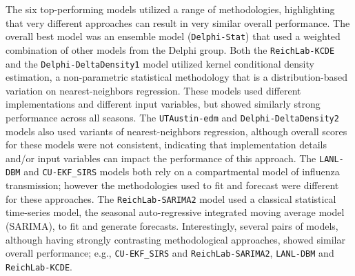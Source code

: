 \documentclass[9pt,twocolumn,twoside]{pnas-new}\usepackage[]{graphicx}\usepackage[]{color}
\begin{document}

The six top-performing models utilized a range of methodologies, highlighting that very different approaches can result in very similar overall performance. 
The overall best model was an ensemble model ({\tt Delphi-Stat}) that used a weighted combination of other models from the Delphi group.
Both the {\tt ReichLab-KCDE} and the {\tt Delphi-DeltaDensity1} model utilized kernel conditional density estimation, a non-parametric statistical methodology that is a distribution-based variation on nearest-neighbors regression. 
These models used different implementations and different input variables, but showed similarly strong performance across all seasons.
The {\tt UTAustin-edm} and {\tt Delphi-DeltaDensity2} models also used variants of nearest-neighbors regression, although overall scores for these models were not consistent, indicating that implementation details and/or input variables can impact the performance of this approach.
The {\tt LANL-DBM} and {\tt CU-EKF\_SIRS} models both rely on a compartmental model of influenza transmission; however the methodologies used to fit and forecast were different for these approaches.
The {\tt ReichLab-SARIMA2} model used a classical statistical time-series model, the seasonal auto-regressive integrated moving average model (SARIMA), to fit and generate forecasts. 
Interestingly, several pairs of models, although having strongly contrasting methodological approaches, showed similar overall performance; e.g., {\tt CU-EKF\_SIRS} and {\tt ReichLab-SARIMA2}, {\tt LANL-DBM} and {\tt ReichLab-KCDE}.
\end{document}
